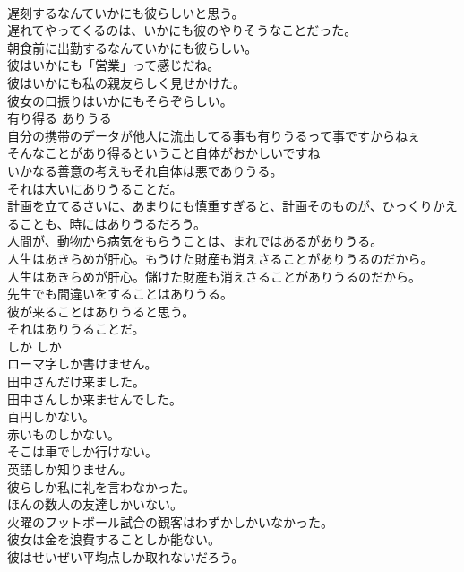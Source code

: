 \documentclass[8pt]{extreport}
\begin{document}
\begin{CJK}{UTF8}{min}
\\	遅刻するなんていかにも彼らしいと思う。  
\\	遅れてやってくるのは、いかにも彼のやりそうなことだった。  
\\	朝食前に出勤するなんていかにも彼らしい。  
\\	彼はいかにも「営業」って感じだね。  
\\	彼はいかにも私の親友らしく見せかけた。  
\\	彼女の口振りはいかにもそらぞらしい。  
\\	有り得る	ありうる	
\\	自分の携帯のデータが他人に流出してる事も有りうるって事ですからねぇ  
\\	そんなことがあり得るということ自体がおかしいですね  
\\	いかなる善意の考えもそれ自体は悪でありうる。  
\\	それは大いにありうることだ。   
\\	計画を立てるさいに、あまりにも慎重すぎると、計画そのものが、ひっくりかえることも、時にはありうるだろう。   
\\	人間が、動物から病気をもらうことは、まれではあるがありうる。   
\\	人生はあきらめが肝心。もうけた財産も消えさることがありうるのだから。   
\\	人生はあきらめが肝心。儲けた財産も消えさることがありうるのだから。  
\\	先生でも間違いをすることはありうる。   
\\	彼が来ることはありうると思う。   
\\	それはありうることだ。   
\\	しか	しか	
\\	ローマ字しか書けません。  
\\	田中さんだけ来ました。  
\\	田中さんしか来ませんでした。  
\\	百円しかない。  
\\	赤いものしかない。  
\\	そこは車でしか行けない。  
\\	英語しか知りません。  
\\	彼らしか私に礼を言わなかった。  
\\	ほんの数人の友達しかいない。  
\\	火曜のフットボール試合の観客はわずかしかいなかった。   
\\	彼女は金を浪費することしか能ない。   
\\	彼はせいぜい平均点しか取れないだろう。   

\end{CJK}
\end{document}
